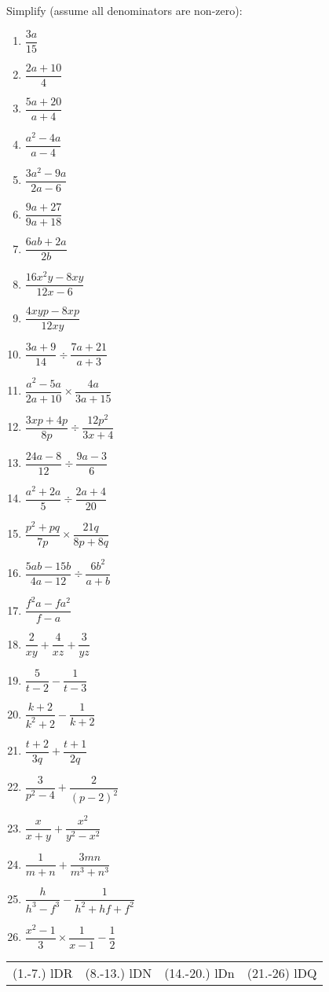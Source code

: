 \begin{exercises}{}
{
Simplify (assume all denominators are non-zero):
\begin{multicols}{2}
\begin{enumerate}[itemsep=5pt, label=\textbf{\arabic*}. ] 
\item$\dfrac{3a}{15}$
\item $\dfrac{2a+10}{4}$
\item $\dfrac{5a+20}{a+4}$
\item $\dfrac{{a}^{2}-4a}{a-4}$
\item $\dfrac{3{a}^{2}-9a}{2a-6}$
\item $\dfrac{9a+27}{9a+18}$
\item $\dfrac{6ab+2a}{2b}$
\item $\dfrac{16{x}^{2}y-8xy}{12x-6}$
\item $\dfrac{4xyp-8xp}{12xy}$
\item $\dfrac{3a+9}{14}÷\dfrac{7a+21}{a+3}$
\item $\dfrac{{a}^{2}-5a}{2a+10} \times \dfrac{4a}{3a+15}$
\item $\dfrac{3xp+4p}{8p}÷\dfrac{12{p}^{2}}{3x+4}$
\item $\dfrac{24a-8}{12}÷\dfrac{9a-3}{6}$
\item $\dfrac{{a}^{2}+2a}{5}÷\dfrac{2a+4}{20}$
\item $\dfrac{{p}^{2}+pq}{7p} \times \dfrac{21q}{8p+8q}$
\item $\dfrac{5ab-15b}{4a-12}÷\dfrac{6{b}^{2}}{a+b}$
\item $\dfrac{{f}^{2}a-f{a}^{2}}{f-a}$
\item $\dfrac{2}{xy} + \dfrac{4}{xz}+\dfrac{3}{yz}$
\item $\dfrac{5}{t-2} - \dfrac{1}{t-3}$
\item $\dfrac{k+2}{k^{2} +2} - \dfrac{1}{k+2}$
\item $\dfrac{t+2}{3q} + \dfrac{t+1}{2q}$
\item $\dfrac{3}{p^{2}-4}+\dfrac{2}{(p-2)^{2}}$
\item $\dfrac{x}{x+y}+\dfrac{x^{2}}{y^{2} - x^{2}}$
\item $\dfrac{1}{m+n} + \dfrac{3mn}{m^{3} + n^{3}}$
\item $\dfrac{h}{h^{3}-f^{3}} - \dfrac{1}{h^{2} + hf + f^{2}}$
\item $\dfrac{{x}^{2}-1}{3}\times\dfrac{1}{x-1}-\dfrac{1}{2}$
\end{enumerate}
\end{multicols}
\practiceinfo 
\par 
\par \begin{tabular}[h]{cccc}
  (1.-7.) lDR  &  (8.-13.) lDN   &  (14.-20.) lDn  &  (21.-26) lDQ \end{tabular}
}
\end{exercises}




